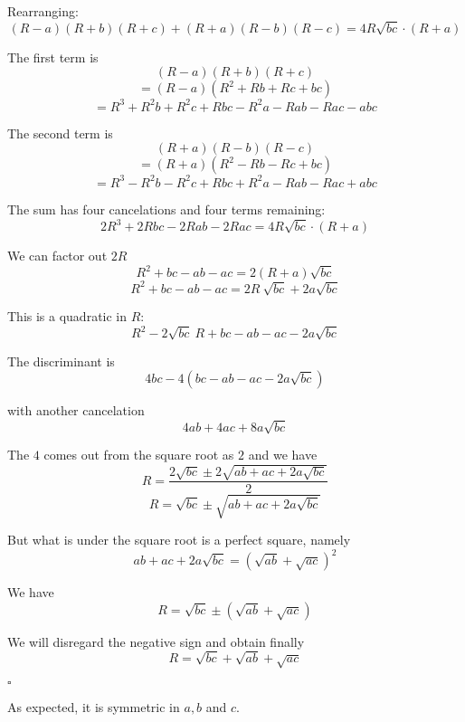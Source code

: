 \documentclass[11pt, oneside]{article}
\begin{document}
Rearranging:
\[ (R-a)(R+b)(R+c) + (R+a)(R-b)(R-c) = 4R \sqrt{bc} \cdot (R + a) \]

The first term is
\[ (R-a)(R+b)(R+c) \]
\[ = (R-a)(R^2 + Rb + Rc + bc) \]
\[ = R^3 + R^2b + R^2c + Rbc -R^2a - Rab - Rac - abc \]

The second term is 
\[ (R+a)(R-b)(R-c) \]
\[ = (R+a)(R^2 - Rb - Rc + bc) \]
\[ = R^3 - R^2b - R^2c + Rbc + R^2a - Rab - Rac + abc \]

The sum has four cancelations and four terms remaining:
\[ 2R^3 + 2Rbc - 2Rab - 2Rac =  4R \sqrt{bc} \cdot (R + a) \]

We can factor out $2R$
\[ R^2 + bc - ab - ac =  2 (R + a) \sqrt{bc} \]
\[ R^2 + bc - ab - ac =  2R \ \sqrt{bc} + 2a \sqrt{bc} \]

This is a quadratic in $R$:
\[ R^2 - 2 \sqrt{bc} \ R + bc - ab - ac - 2a \sqrt{bc} \]

The discriminant is
\[ 4bc - 4(bc - ab - ac - 2a \sqrt{bc}) \]

with another cancelation
\[ 4ab + 4ac + 8a \sqrt{bc} \]

The $4$ comes out from the square root as $2$ and we have
\[ R = \frac{2 \sqrt{bc} \pm 2 \sqrt{ab + ac + 2a \sqrt{bc}}}{2} \]
\[ R = \sqrt{bc} \pm \sqrt{ab + ac + 2a \sqrt{bc}} \]

But what is under the square root is a perfect square, namely
\[ ab + ac + 2a \sqrt{bc} = (\sqrt{ab} + \sqrt{ac})^2 \]

We have
\[ R = \sqrt{bc} \pm (\sqrt{ab} + \sqrt{ac}) \]

We will disregard the negative sign and obtain finally
\[ R = \sqrt{bc} + \sqrt{ab} + \sqrt{ac} \]

$\square$

As expected, it is symmetric in $a,b$ and $c$.
\end{document}
